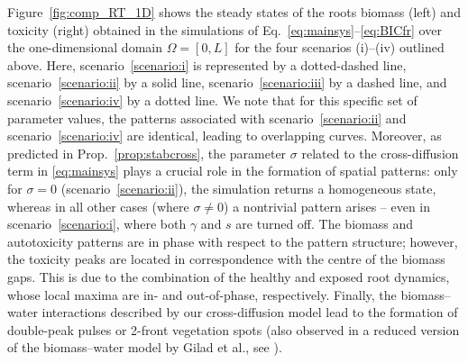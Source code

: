 \documentclass[11pt]{elsarticle}
\theoremstyle{plain}
\theoremstyle{definition}
\theoremstyle{myremark}
\begin{document}


Figure~\ref{fig:comp_RT_1D} shows the steady states of the roots biomass (left) and toxicity (right) obtained in the simulations of Eq.~\eqref{eq:mainsys}--\eqref{eq:BICfr} over the one-dimensional domain $\Omega = [0,L]$ for the four scenarios (i)--(iv) outlined above. Here, scenario~\eqref{scenario:i} is represented by a dotted-dashed line, scenario~\eqref{scenario:ii} by a solid line, scenario~\eqref{scenario:iii} by a dashed line, and scenario~\eqref{scenario:iv} by a dotted line. We note that for this specific set of parameter values, the patterns associated with scenario~\eqref{scenario:ii} and scenario~\eqref{scenario:iv} are identical, leading to overlapping curves. Moreover, as predicted in Prop.~\ref{prop:stabcross}, the parameter $\sigma$ related to the cross-diffusion term in \eqref{eq:mainsys} plays a crucial role in the formation of spatial patterns: only for $\sigma=0$ (scenario~\eqref{scenario:ii}), the simulation returns a homogeneous state, whereas in all other cases (where $\sigma \neq 0$) a nontrivial pattern arises -- even in scenario~\eqref{scenario:i}, where both $\gamma$ and $s$ are turned off. 
The biomass and autotoxicity patterns are in phase with respect to the pattern structure; however, the toxicity peaks are located in correspondence with the centre of the biomass gaps. This is due to the combination of the healthy and exposed root dynamics, whose local maxima are in- and out-of-phase, respectively.
Finally, the biomass--water interactions described by our cross-diffusion model lead to the formation of double-peak pulses or 2-front vegetation spots (also observed in a reduced version of the biomass--water model by Gilad et al., see \cite{Jaibi_2020}). 
\end{document}
